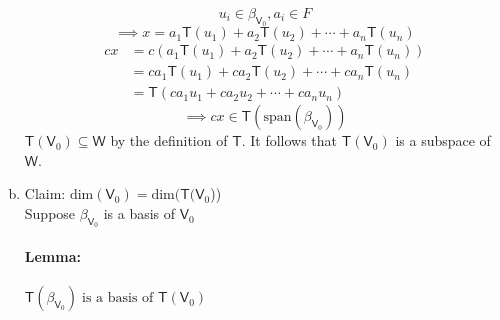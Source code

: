 \begin{enumerate}[(a)]
\begin{equation}
u_i\in \beta_{\mathsf{V}_0}, a_i \in F
\end{equation}
\begin{equation}
\implies x = a_1\mathsf{T}(u_1) + a_2\mathsf{T}(u_2) + \dotsb + a_n\mathsf{T}(u_n)
\end{equation}
\begin{align}
cx &= c\left(a_1\mathsf{T}(u_1) + a_2\mathsf{T}(u_2) + \dotsb +
  a_n\mathsf{T}(u_n) \right)\\
&= ca_1\mathsf{T}(u_1) + ca_2\mathsf{T}(u_2) +\dotsb +
ca_n\mathsf{T}(u_n)\\
&= \mathsf{T}(ca_1u_1 + ca_2u_2 + \dotsb + ca_nu_n)
\end{align}
\begin{equation}
\implies cx \in \mathsf{T}(\text{span}(\beta_{\mathsf{V}_0}))
\end{equation}
$\mathsf{T}(\mathsf{V}_0) \subseteq \mathsf{W}$ by the definition of
$\mathsf{T}$. It follows that $\mathsf{T}(\mathsf{V}_0)$ is a subspace
of $\mathsf{W}$.
\item Claim: $\text{dim}(\mathsf{V}_0) = \text{dim}(\mathsf{T}(\mathsf{V}_0$))
\\Suppose $\beta_{\mathsf{V}_0}$ is a basis of $\mathsf{V}_0$
\paragraph{Lemma:} $\mathsf{T}(\beta_{\mathsf{V}_0}) \; \text{is a
  basis of } \mathsf{T}(\mathsf{V}_0)$


\end{enumerate}
